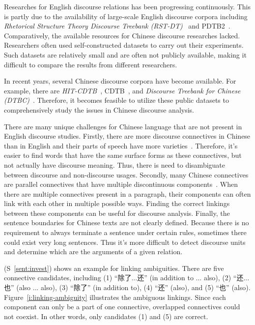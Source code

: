 Researches for English discourse relations has been progressing continuously. This is
partly due to the availability of large-scale English discourse corpora including
\textit{Rhetorical Structure Theory Discourse Treebank (RST-DT)}~\citep{Carlson01building}
and PDTB2~\citep{Prasad08thepenn}. Comparatively, the available resources for Chinese discourse
researches lacked. Researchers often used self-constructed datasets to carry
out their experiments. Such datasets are relatively small and are often not publicly
available, making it difficult to compare the results from different researchers.

In recent years, several Chinese discourse corpora have become available. For example,
there are \textit{HIT-CDTB}~\citep{zhang2014chinese}, CDTB~\citep{li2014building}, and
\textit{Discourse Treebank for Chinese (DTBC)}~\citep{zhou2014the}. Therefore, it
becomes feasible to utilize these public datasets to comprehensively study
the issues in Chinese discourse analysis.

There are many unique challenges for Chinese language that are not present in
English discourse studies. Firstly, there are more discourse connectives
in Chinese than in English and their parts of speech have more
varieties~\citep{huang2014interpretation}. Therefore, it's easier to find words
that have the same surface forms as these connectives, but not actually have
discourse meaning. Thus, there is need to disambiguate between
discourse and non-discourse usages.
Secondly, many Chinese connectives are parallel connectives that
have multiple discontinuous components~\citep{zhou2012pdtb}.
When there are multiple connectives present in a paragraph, their components
can often link with each other in multiple possible ways.
Finding the correct linkings between these components
can be useful for discourse analysis. Finally, the sentence boundaries for
Chinese texts are not clearly defined. Because there is no
requirement to always terminate a sentence under certain rules,
sometimes there could exist very long sentences. Thus it's more difficult
to detect discourse units and determine which are the arguments of a given relation.

(S~\ref{sent:invest}) shows an example for linking ambiguities.
There are five connective candidates, including (1) ``除了...还''
(in addition to ... also), (2) ``还...也'' (also ... also),
(3) ``除了'' (in addition to), (4) ``还'' (also), and (5) ``也'' (also).
Figure~\ref{i:linking-ambiguity} illustrates the ambiguous linkings. Since each
component can only be a part of one connective, overlapped connectives could
not coexist.  In other words, only candidates (1) and (5) are correct.

